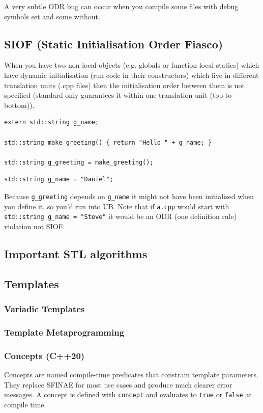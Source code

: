 \documentclass{article}
\begin{document}
A very subtle ODR bug can occur when you compile some files with debug symbols set and some without.

\subsection{SIOF (Static Initialisation Order Fiasco)}
When you have two non-local objects (e.g. globals or function-local statics) which have dynamic initialisation (run code in their constructors) which live in different translation units (.cpp files) then the initialisation order between them is not specified (standard only guarantees it within one translation unit (top-to-bottom)).
\begin{lstlisting}[caption={a.cpp}]
extern std::string g_name;

std::string make_greeting() { return "Hello " + g_name; }

std::string g_greeting = make_greeting();
\end{lstlisting}

\begin{lstlisting}[caption={b.cpp}]
std::string g_name = "Daniel";
\end{lstlisting}

Because \texttt{g\_greeting} depends on \texttt{g\_name} it might not have been initialised when you define it, so you'd run into UB. Note that if \texttt{a.cpp} would start with \texttt{std::string g\_name = "Steve"} it would be an ODR (one definition rule) violation not SIOF.

\subsection{Important STL algorithms}
\subsection{Templates}
\subsubsection{Variadic Templates}
\subsubsection{Template Metaprogramming}

\subsubsection{Concepts (C++20)}
Concepts are named compile-time predicates that constrain template parameters. They replace SFINAE for most use cases and produce much clearer error messages. A concept is defined with \texttt{concept} and evaluates to \texttt{true} or \texttt{false} at compile time.
\end{document}

